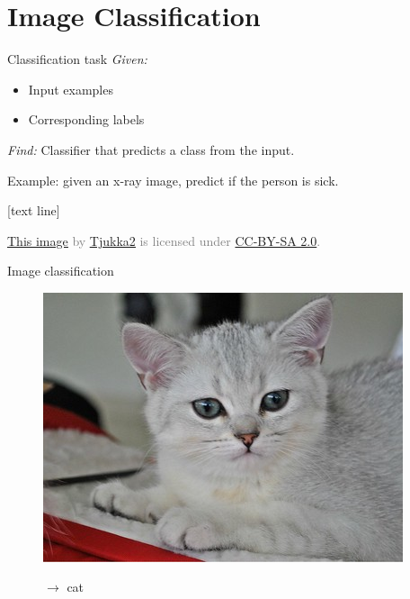 \documentclass[dvipsnames]{beamer}
\newcommand{\referencefootnote}[1]{\setbeamertemplate{footline}[text line]{%
\parbox{0.9\paperwidth}{\vspace*{-23pt}\tiny{\textcolor{gray}{#1}}\hfill\scriptsize\insertframenumber}}}
\begin{document}
			\section{Image Classification}
    \begin{frame}{Classification task}
			\emph{Given:} 
			\begin{itemize}
				\item Input examples
				\item Corresponding labels
			\end{itemize}
			
			\emph{Find:} Classifier that predicts a class from the input.
			
			Example: given an x-ray image, predict if the person is sick.
    \end{frame}
{ \referencefootnote{\href{https://www.flickr.com/photos/tjukka2/8565139583/sizes/l/}{\underline{This image}} by \href{https://www.flickr.com/photos/tjukka2/}{\underline{Tjukka2}} is licensed under \href{https://creativecommons.org/licenses/by-nc-sa/2.0/}{CC-BY-SA 2.0}.}
\begin{frame}{Image classification}
				\begin{figure}[htbp]
					\begin{minipage}[t]{5.5cm}
						\vspace{0pt}
						\includegraphics[scale=.4]{figures/cat4.jpg}
					\end{minipage}
					\hspace{1.5cm} %
					\begin{minipage}[t]{2.5cm}
						\vspace{50pt}
						$\longrightarrow$ \quad cat
					\end{minipage}
				\end{figure}
\end{frame}
}
\end{document}
